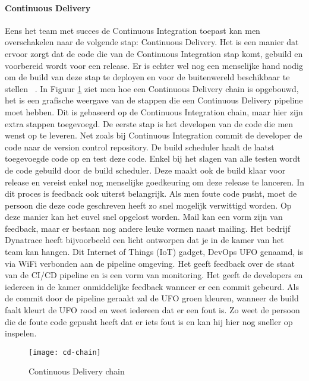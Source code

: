     \paragraph{Continuous Delivery}
    Eens het team met succes de Continuous Integration toepast kan men overschakelen naar de volgende stap: Continuous Delivery.
    Het is een manier dat ervoor zorgt dat de code die van de Continuous Integration stap komt, gebuild en voorbereid wordt voor een release.
    Er is echter wel nog een menselijke hand nodig om de build van deze stap te deployen en voor de buitenwereld beschikbaar te stellen ~\autocite{Fowler2013}.
    \newline{}In Figuur \ref{img-cd-chain} ziet men hoe een Continuous Delivery chain is opgebouwd, het is een grafische weergave van de stappen die een Continuous Delivery pipeline moet hebben. Dit is gebaseerd op de Continuous Integration chain, maar hier zijn extra stappen toegevoegd.
    De eerste stap is het developen van de code die men wenst op te leveren. Net zoals bij Continuous Integration commit de developer de code naar de version control repository. De build scheduler haalt de laatst toegevoegde code op en test deze code. Enkel bij het slagen van alle testen wordt de code gebuild door de build scheduler. Deze maakt ook de build klaar voor release en vereist enkel nog menselijke goedkeuring om deze release te lanceren.
    \newline{}In dit proces is feedback ook uiterst belangrijk. Als men foute code pusht, moet de persoon die deze code geschreven heeft zo snel mogelijk verwittigd worden. Op deze manier kan het euvel snel opgelost worden.
    Mail kan een vorm zijn van feedback, maar er bestaan nog andere leuke vormen naast mailing. Het bedrijf Dynatrace heeft bijvoorbeeld een licht ontworpen dat je in de kamer van het team kan hangen. Dit Internet of Things (IoT) gadget, DevOps UFO genaamd, is via WiFi verbonden aan de pipeline omgeving. Het geeft feedback over de staat van de CI/CD pipeline en is een vorm van monitoring. Het geeft de developers en iedereen in de kamer onmiddelijke feedback wanneer er een commit gebeurd. Als de commit door de pipeline geraakt zal de UFO groen kleuren, wanneer de build faalt kleurt de UFO rood en weet iedereen dat er een fout is. Zo weet de persoon die de foute code gepusht heeft dat er iets fout is en kan hij hier nog sneller op inspelen. 
    \begin{figure}	
        \texttt{[image: cd-chain]}
        \caption{Continuous Delivery chain ~\autocite{Riti2018}} \label{img-cd-chain}
    \end{figure}
    
